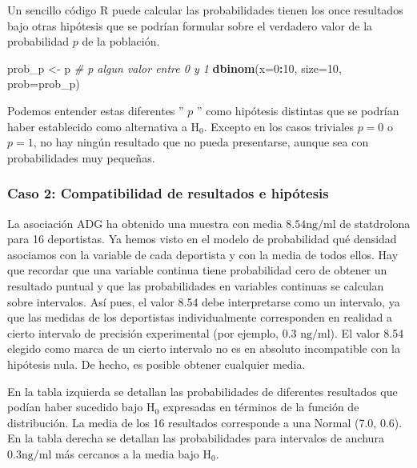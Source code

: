 \documentclass[
]{article}
\newenvironment{Shaded}{\begin{snugshade}}{\end{snugshade}}
\newcommand{\AttributeTok}[1]{\textcolor[rgb]{0.13,0.29,0.53}{#1}}
\newcommand{\CommentTok}[1]{\textcolor[rgb]{0.56,0.35,0.01}{\textit{#1}}}
\newcommand{\DecValTok}[1]{\textcolor[rgb]{0.00,0.00,0.81}{#1}}
\newcommand{\FunctionTok}[1]{\textcolor[rgb]{0.13,0.29,0.53}{\textbf{#1}}}
\newcommand{\NormalTok}[1]{#1}
\newcommand{\OtherTok}[1]{\textcolor[rgb]{0.56,0.35,0.01}{#1}}
\newcommand{\SpecialCharTok}[1]{\textcolor[rgb]{0.81,0.36,0.00}{\textbf{#1}}}
\begin{document}
Un sencillo código R puede calcular las probabilidades tienen los once resultados bajo otras hipótesis que se podrían formular sobre el verdadero valor de la probabilidad \(p\) de la población.

\begin{Shaded}
\begin{Highlighting}[]
\NormalTok{prob\_p }\OtherTok{\textless{}{-}}\NormalTok{ p }\CommentTok{\# p algun valor entre 0 y 1}
\FunctionTok{dbinom}\NormalTok{(}\AttributeTok{x=}\DecValTok{0}\SpecialCharTok{:}\DecValTok{10}\NormalTok{, }\AttributeTok{size=}\DecValTok{10}\NormalTok{, }\AttributeTok{prob=}\NormalTok{prob\_p)}
\end{Highlighting}
\end{Shaded}

Podemos entender estas diferentes '' \(p\) '' como hipótesis distintas que se podrían haber establecido como alternativa a \(\mathrm{H}_{0}\). Excepto en los casos triviales \(p=0\) o \(p=1\), no hay ningún resultado que no pueda presentarse, aunque sea con probabilidades muy pequeñas.

\subsubsection{Caso 2: Compatibilidad de resultados e hipótesis}\label{caso-2-compatibilidad-de-resultados-e-hipuxf3tesis}

La asociación ADG ha obtenido una muestra con media \(8.54 \mathrm{ng} / \mathrm{ml}\) de statdrolona para 16 deportistas. Ya hemos visto en el modelo de probabilidad qué densidad asociamos con la variable de cada deportista y con la media de todos ellos. Hay que recordar que una variable continua tiene probabilidad cero de obtener un resultado puntual y que las probabilidades en variables continuas se calculan sobre intervalos. Así pues, el valor 8.54 debe interpretarse como un intervalo, ya que las medidas de los deportistas individualmente corresponden en realidad a cierto intervalo de precisión experimental (por ejemplo, 0.3 \(\mathrm{ng} / \mathrm{ml}\)). El valor 8.54 elegido como marca de un cierto intervalo no es en absoluto incompatible con la hipótesis nula. De hecho, es posible obtener cualquier media.

En la tabla izquierda se detallan las probabilidades de diferentes resultados que podían haber sucedido bajo \(\mathrm{H}_{0}\) expresadas en términos de la función de distribución. La media de los 16 resultados corresponde a una Normal (7.0, 0.6). En la tabla derecha se detallan las probabilidades para intervalos de anchura \(0.3 \mathrm{ng} / \mathrm{ml}\) más cercanos a la media bajo \(\mathrm{H}_{0}\).
\end{document}
